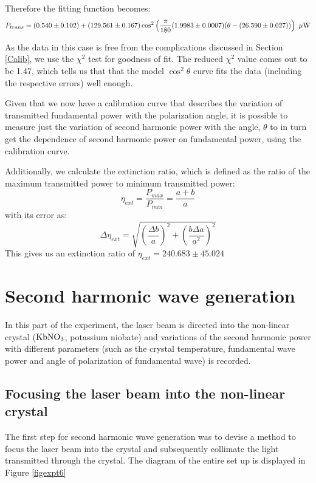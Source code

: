Therefore the fitting function becomes: 
\begin{equation}
P_{trans}=(0.540\pm 0.102)+(129.561\pm 0.167)\cos^{2}\left(\dfrac{\pi}{180}(1.9983\pm 0.0007)(\theta-(26.590\pm 0.027))\right) \ \mu\rm{W}
\end{equation}

As the data in this case is free from the complications discussed in Section \ref{Calib}, we use the $\chi^{2}$ test for goodness of fit. The reduced $\chi^{2}$ value comes out to be 1.47, which tells us that that the model $\cos^{2}\theta$ curve fits the data (including the respective errors) well enough. 

Given that we now have a calibration curve that describes the variation of transmitted fundamental power with the polarization angle, it is possible to measure just the variation of second harmonic power with the angle, $\theta$ to in turn get the dependence of second harmonic power on fundamental power, using the calibration curve. 

Additionally, we calculate the extinction ratio, which is defined as the ratio of the maximum transmitted power to minimum transmitted power:
\begin{equation}
\eta_{ext}=\dfrac{P_{max}}{P_{min}}=\dfrac{a+b}{a}
\end{equation}
with its error as:
\begin{equation}
\Delta \eta_{ext}=\sqrt{\left(\dfrac{\Delta b}{a}\right)^{2}+\left(\dfrac{b\Delta a}{a^{2}}\right)^{2}}
\end{equation}
This gives us an extinction ratio of $\eta_{ext}=240.683\pm 45.024$

\section{Second harmonic wave generation}
In this part of the experiment, the laser beam is directed into the non-linear crystal ($\rm{KbNO_{3}}$, potassium niobate) and variations of the second harmonic power with different parameters (such as the crystal temperature, fundamental wave power and angle of polarization of fundamental wave) is recorded.

\subsection{Focusing the laser beam into the non-linear crystal}
The first step for second harmonic wave generation was to devise a method to focus the laser beam into the crystal and subsequently collimate the light transmitted through the crystal. The diagram of the entire set up is displayed in Figure \ref{figexpt6}

